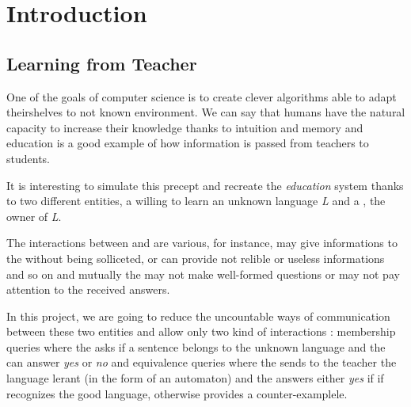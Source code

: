 \section{Introduction}

\subsection{Learning from Teacher}


One of the goals of computer science is to create clever algorithms able to adapt theirshelves to not known environment. We can say that humans have the natural capacity to increase their knowledge thanks to intuition and memory and education is a good example of how information is passed from teachers to students.

It is interesting to simulate this precept and recreate the \textit{education} system thanks to two different entities, a \learner{} willing to learn an unknown language \textit{L} and a \teacher{}, the owner of \textit{L}.

The interactions between \learner{} and \teacher{} are various, for instance, \teacher{} may give informations to the \learner{} without being solliceted, or can provide not relible or useless informations and so on and mutually the \learner{} may not make well-formed questions or may not pay attention to the received answers.

In this project, we are going to reduce the uncountable ways of communication between these two entities and allow only two kind of interactions : membership queries where the \learner{} asks if a sentence belongs to the unknown language and the \teacher{} can answer \textit{yes} or \textit{no} and
equivalence queries where the \learner{} sends to the teacher the language lerant (in the form of an automaton) and the \teacher{} answers either \textit{yes} if if recognizes the good language, otherwise provides a counter-examplele.

